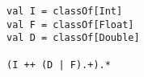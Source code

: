 \begin{lstlisting}[style=scalaioScala]
val I = classOf[Int]
val F = classOf[Float]
val D = classOf[Double]

(I ++ (D | F).+).*
\end{lstlisting}
